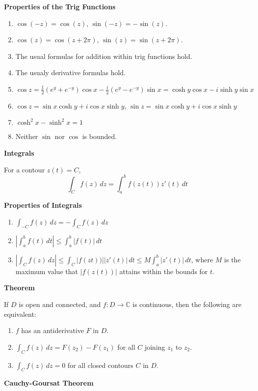 \documentclass{article}
\begin{document}
\medskip\noindent\textbf{Properties of the Trig Functions}
\begin{enumerate}
    \item $\cos(-z) = \cos(z)$, $\sin(-z) = -\sin(z)$.
    \item $\cos(z) = \cos(z + 2\pi)$, $\sin(z) = \sin(z + 2\pi)$.
    \item The usual formulas for addition within trig functions hold.
    \item The usualy derivative formulas hold.
    \item $\cos z = \frac12(e^{y} + e^{-y})\cos x - \frac i2(e^y-e^{-y})\sin x = \cosh y \cos x - i\sinh y \sin x$
    \item $\cos z = \sin x \cosh y + i\cos x \sinh y$, $\sin z = \sin x \cosh y + i \cos x \sinh y$
    \item $\cosh^2 x - \sinh^2 x = 1$
    \item Neither $\sin$ nor $\cos$ is bounded.
\end{enumerate}

\medskip\noindent\textbf{Integrals}
    
    For a contour $z(t) = C$,
    $$\int_{C} f(z)\,dz = \int_a^b f(z(t))z'(t)\,dt$$

\medskip\noindent\textbf{Properties of Integrals}
\begin{enumerate}
    \item $\int_{-C}f(z)\,dz = -\int_Cf(z)\,dz$
    \item $|\int_a^bf(t)\,dt| \leq \int_a^b|f(t)|\,dt$
    \item $|\int_Cf(z)\,dz| \leq \int_C |f(zt))| |z'(t)|\,dt \leq M\int_a^b|z'(t)|\,dt$, where $M$ is the maximum value that $|f(z(t))|$ attains within the bounds for $t$.
\end{enumerate}

\medskip\noindent\textbf{Theorem}

    If $D$ is open and connected, and $f: D \to \mathbb C$ is continuous, then the following are equivalent:
    \begin{enumerate}
        \item $f$ has an antiderivative $F$ in $D$.
        \item $\int_C f(z)\,dz = F(z_2) - F(z_1)$ for all $C$ joining $z_1$ to $z_2$.
        \item $\int_Cf(z)\,dz = 0$ for all closed contours $C$ in $D$.
    \end{enumerate}

\medskip\noindent\textbf{Cauchy-Goursat Theorem}
\end{document}
